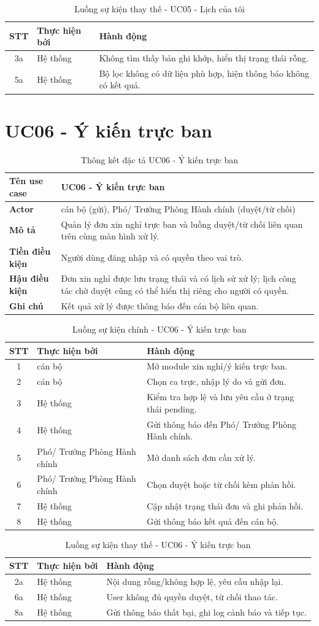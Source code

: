 \documentclass[18pt,a4paper]{report}
\newcommand{\specinfo}[6]{
\begin{table}[H]
\centering
\caption{Thông kết đặc tả #1}
\begin{tabularx}{\textwidth}{|>{\raggedright\arraybackslash}p{3.2cm}|X|}
\hline
\textbf{Tên use case} & #1 \\ \hline
\textbf{Actor} & #2 \\ \hline
\textbf{Mô tả} & #3 \\ \hline
\textbf{Tiền điều kiện} & #4 \\ \hline
\textbf{Hậu điều kiện} & #5 \\ \hline
\textbf{Ghi chú} & #6 \\ \hline
\end{tabularx}
\end{table}
}
\newcommand{\mainflowtable}[1]{
\begin{table}[H]
\centering
\caption{Luồng sự kiện chính - #1}
\begin{tabularx}{\textwidth}{|c|>{\raggedright\arraybackslash}p{3cm}|X|}
\hline
\textbf{STT} & \textbf{Thực hiện bởi} & \textbf{Hành động} \\ \hline
}
\newcommand{\altflowtable}[1]{
\begin{table}[H]
\centering
\caption{Luồng sự kiện thay thế - #1}
\begin{tabularx}{\textwidth}{|c|>{\raggedright\arraybackslash}p{3cm}|X|}
\hline
\textbf{STT} & \textbf{Thực hiện bởi} & \textbf{Hành động} \\ \hline
}
\begin{document}
\altflowtable{UC05 - Lịch của tôi}
3a & Hệ thống & Không tìm thấy bản ghi khớp, hiển thị trạng thái rỗng. \\ \hline
5a & Hệ thống & Bộ lọc không có dữ liệu phù hợp, hiện thông báo không có kết quả. \\ \hline
\end{tabularx}
\end{table}

\section{UC06 - Ý kiến trực ban}
\specinfo
{UC06 - Ý kiến trực ban}
{cán bộ (gửi), Phó/ Trưởng Phòng Hành chính (duyệt/từ chối)}
{Quản lý đơn xin nghỉ trực ban và luồng duyệt/từ chối liên quan trên cùng màn hình xử lý.}
{Người dùng đăng nhập và có quyền theo vai trò.}
{Đơn xin nghỉ được lưu trạng thái và có lịch sử xử lý; lịch công tác chờ duyệt cũng có thể hiển thị riêng cho người có quyền.}
{Kết quả xử lý được thông báo đến cán bộ liên quan.}

\mainflowtable{UC06 - Ý kiến trực ban}
1 & cán bộ & Mở module xin nghỉ/ý kiến trực ban. \\ \hline
2 & cán bộ & Chọn ca trực, nhập lý do và gửi đơn. \\ \hline
3 & Hệ thống & Kiểm tra hợp lệ và lưu yêu cầu ở trạng thái pending. \\ \hline
4 & Hệ thống & Gửi thông báo đến Phó/ Trưởng Phòng Hành chính. \\ \hline
5 & Phó/ Trưởng Phòng Hành chính & Mở danh sách đơn cần xử lý. \\ \hline
6 & Phó/ Trưởng Phòng Hành chính & Chọn duyệt hoặc từ chối kèm phản hồi. \\ \hline
7 & Hệ thống & Cập nhật trạng thái đơn và ghi phản hồi. \\ \hline
8 & Hệ thống & Gửi thông báo kết quả đến cán bộ. \\ \hline
\end{tabularx}
\end{table}

\altflowtable{UC06 - Ý kiến trực ban}
2a & Hệ thống & Nội dung rỗng/không hợp lệ, yêu cầu nhập lại. \\ \hline
6a & Hệ thống & User không đủ quyền duyệt, từ chối thao tác. \\ \hline
8a & Hệ thống & Gửi thông báo thất bại, ghi log cảnh báo và tiếp tục. \\ \hline
\end{tabularx}
\end{table}
\end{document}
